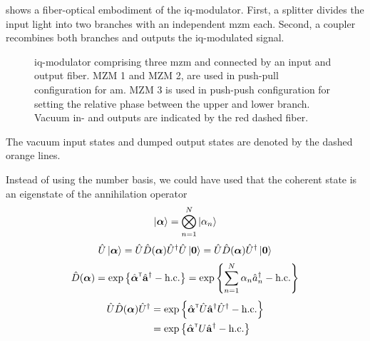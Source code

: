  shows a fiber-optical embodiment of the \gls{iq}-modulator.
First, a splitter divides the input light into two branches with an independent \gls{mzm} each.
Second, a coupler recombines both branches and outputs the \gls{iq}-modulated signal.
\begin{figure}[htb]
	\centering
	
	\caption{\gls{iq}-modulator comprising three \gls{mzm} and connected by an input and output fiber. MZM 1 and MZM 2, are used in push-pull configuration for \gls{am}. MZM 3 is used in push-push configuration for setting the relative phase between the upper and lower branch. Vacuum in- and outputs are indicated by the red dashed fiber.}\label{fig:iqm}
\end{figure}
The vacuum input states and dumped output states are denoted by the dashed orange lines.

Instead of using the number basis, we could have used that the coherent state is an eigenstate of the annihilation operator
\begin{equation}
	\ket{\boldsymbol{\alpha}}
	=
	\bigotimes_{n=1}^N
	\ket{\alpha_n}
\end{equation}
\begin{equation}
	\hat{U}
	\ket{\boldsymbol{\alpha}}
	=
	\hat{U}
	\hat{D}(\boldsymbol{\alpha})
	\hat{U}^\dagger
	\hat{U}
	\ket{\vb{0}}
	=
	\hat{U}
	\hat{D}(\boldsymbol{\alpha})
	\hat{U}^\dagger
	\ket{\vb{0}}
\end{equation}
\begin{equation}
	\hat{D}(\boldsymbol{\alpha})
	=
	\exp\left\{
		\hat{\boldsymbol{\alpha}}^{\scriptscriptstyle\mathsf{T}}
		\hat{\vb{a}}^\dagger
		-
		\text{h.c.}
	\right\}
	=
	\exp\left\{
		\sum_{n=1}^N
		\alpha_n
		\hat{a}_n^\dagger
		-
		\text{h.c.}
	\right\}
\end{equation}
\begin{equation}
	\begin{split}
		\hat{U}
		\hat{D}(\boldsymbol{\alpha})
		\hat{U}^\dagger
		&=
		\exp\left\{
			\hat{\boldsymbol{\alpha}}^{\scriptscriptstyle\mathsf{T}}
			\hat{U}
			\hat{\vb{a}}^\dagger
			\hat{U}^\dagger
			-
			\text{h.c.}
		\right\}
		\\
		&=
		\exp\left\{
			\hat{\boldsymbol{\alpha}}^{\scriptscriptstyle\mathsf{T}}
			U
			\hat{\vb{a}}^\dagger
			-
			\text{h.c.}
		\right\}		
	\end{split}
\end{equation}

